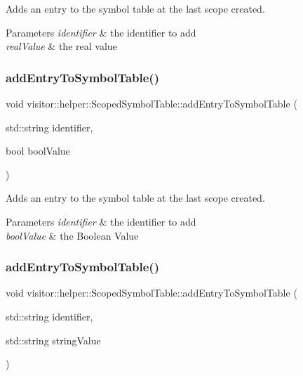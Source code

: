 Adds an entry to the symbol table at the last scope created. 
\begin{DoxyParams}{Parameters}
{\em identifier} & the identifier to add \\
\hline
{\em real\+Value} & the real value \\
\hline
\end{DoxyParams}
\mbox{\label{classvisitor_1_1helper_1_1ScopedSymbolTable_a4161155b0e73f398bb816a92895f5099}} 
\subsubsection{\texorpdfstring{add\+Entry\+To\+Symbol\+Table()}{addEntryToSymbolTable()}\hspace{0.1cm}{\footnotesize\ttfamily [4/7]}}
{\footnotesize\ttfamily void visitor\+::helper\+::\+Scoped\+Symbol\+Table\+::add\+Entry\+To\+Symbol\+Table (\begin{DoxyParamCaption}\item[{std\+::string}]{identifier,  }\item[{bool}]{bool\+Value }\end{DoxyParamCaption})}

Adds an entry to the symbol table at the last scope created. 
\begin{DoxyParams}{Parameters}
{\em identifier} & the identifier to add \\
\hline
{\em bool\+Value} & the Boolean Value \\
\hline
\end{DoxyParams}
\mbox{\label{classvisitor_1_1helper_1_1ScopedSymbolTable_ad9531010cb89b1fc09e4850894c957a2}} 
\subsubsection{\texorpdfstring{add\+Entry\+To\+Symbol\+Table()}{addEntryToSymbolTable()}\hspace{0.1cm}{\footnotesize\ttfamily [5/7]}}
{\footnotesize\ttfamily void visitor\+::helper\+::\+Scoped\+Symbol\+Table\+::add\+Entry\+To\+Symbol\+Table (\begin{DoxyParamCaption}\item[{std\+::string}]{identifier,  }\item[{std\+::string}]{string\+Value }\end{DoxyParamCaption})}

